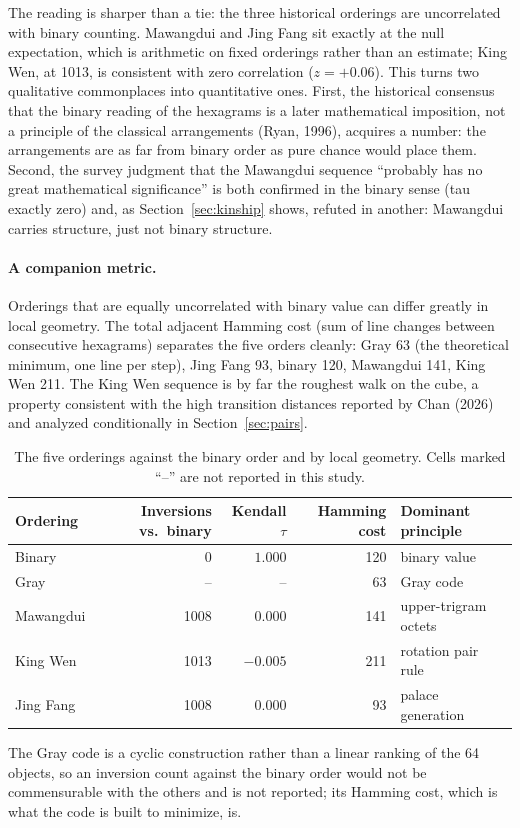 \documentclass[11pt]{article}
\begin{document}
The reading is sharper than a tie: the three historical orderings are uncorrelated with binary counting. Mawangdui and Jing Fang sit exactly at the null expectation, which is arithmetic on fixed orderings rather than an estimate; King Wen, at 1013, is consistent with zero correlation ($z = +0.06$). This turns two qualitative commonplaces into quantitative ones. First, the historical consensus that the binary reading of the hexagrams is a later mathematical imposition, not a principle of the classical arrangements (Ryan, 1996), acquires a number: the arrangements are as far from binary order as pure chance would place them. Second, the survey judgment that the Mawangdui sequence ``probably has no great mathematical significance'' is both confirmed in the binary sense (tau exactly zero) and, as Section~\ref{sec:kinship} shows, refuted in another: Mawangdui carries structure, just not binary structure.

\paragraph{A companion metric.} Orderings that are equally uncorrelated with binary value can differ greatly in local geometry. The total adjacent Hamming cost (sum of line changes between consecutive hexagrams) separates the five orders cleanly: Gray 63 (the theoretical minimum, one line per step), Jing Fang 93, binary 120, Mawangdui 141, King Wen 211. The King Wen sequence is by far the roughest walk on the cube, a property consistent with the high transition distances reported by Chan (2026) and analyzed conditionally in Section~\ref{sec:pairs}.

\begin{table}[t]
\centering
\caption{The five orderings against the binary order and by local geometry. Cells marked ``--'' are not reported in this study.}
\label{tab:orders}
\begin{tabular}{lrrrl}
\toprule
Ordering & Inversions vs.\ binary & Kendall $\tau$ & Hamming cost & Dominant principle \\
\midrule
Binary    & 0    & $1.000$  & 120 & binary value \\
Gray      & --   & --       & 63  & Gray code \\
Mawangdui & 1008 & $0.000$  & 141 & upper-trigram octets \\
King Wen  & 1013 & $-0.005$ & 211 & rotation pair rule \\
Jing Fang & 1008 & $0.000$  & 93  & palace generation \\
\bottomrule
\end{tabular}
\par\vspace{3pt}
{\footnotesize\raggedright The Gray code is a cyclic construction rather than a linear ranking of the 64 objects, so an inversion count against the binary order would not be commensurable with the others and is not reported; its Hamming cost, which is what the code is built to minimize, is.\par}
\end{table}
\end{document}
